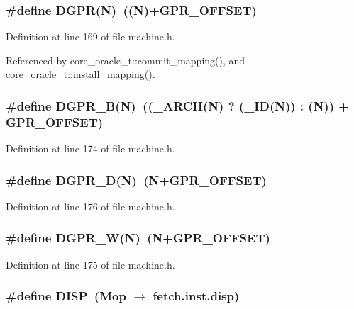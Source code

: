\subsubsection[{DGPR}]{\setlength{\rightskip}{0pt plus 5cm}\#define DGPR(N)~((N)+GPR\_\-OFFSET)}\label{machine_8h_7958b4dc7e6644b7c434becf7e2447f2}




Definition at line 169 of file machine.h.

Referenced by core\_\-oracle\_\-t::commit\_\-mapping(), and core\_\-oracle\_\-t::install\_\-mapping().
\subsubsection[{DGPR\_\-B}]{\setlength{\rightskip}{0pt plus 5cm}\#define DGPR\_\-B(N)~((\_\-ARCH(N) ? (\_\-ID(N)) : (N)) + GPR\_\-OFFSET)}\label{machine_8h_f99d5a0128bae47a2f50a004d32c4c75}




Definition at line 174 of file machine.h.
\subsubsection[{DGPR\_\-D}]{\setlength{\rightskip}{0pt plus 5cm}\#define DGPR\_\-D(N)~(N+GPR\_\-OFFSET)}\label{machine_8h_9189b9d15ac5f8c3e04b79b4e7a150b9}




Definition at line 176 of file machine.h.
\subsubsection[{DGPR\_\-W}]{\setlength{\rightskip}{0pt plus 5cm}\#define DGPR\_\-W(N)~(N+GPR\_\-OFFSET)}\label{machine_8h_6a88ba8081f6daa5688b55c7ec454eaa}




Definition at line 175 of file machine.h.
\subsubsection[{DISP}]{\setlength{\rightskip}{0pt plus 5cm}\#define DISP~(Mop $\rightarrow$ fetch.inst.disp)}\label{machine_8h_20ec8425dec7bc4df44673206768c072}




